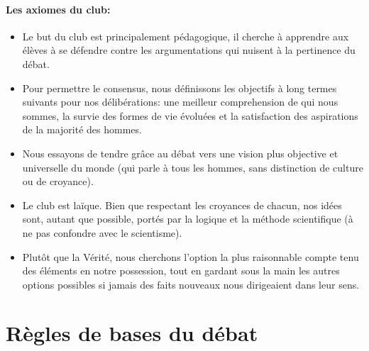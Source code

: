 \documentclass[a4paper,12pt]{article}
\begin{document}
\paragraph{Les axiomes du club:}
\begin{itemize}
 \item  Le but du club est principalement pédagogique, il cherche à apprendre aux élèves à se défendre contre les argumentations qui nuisent à la pertinence du débat.
 \item  Pour permettre le consensus, nous définissons les objectifs à long termes suivants pour nos délibérations: une meilleur comprehension de qui nous sommes, la survie des formes de vie évoluées et la satisfaction des aspirations de la majorité des hommes.
 \item  Nous essayons de tendre grâce au débat vers une vision plus objective et universelle du monde (qui parle à tous les hommes, sans distinction de culture ou de croyance).
 \item  Le club est laïque. Bien que respectant les croyances de chacun, nos idées sont, autant que possible, portés par la logique et la méthode scientifique (à ne pas confondre avec le scientisme).
 \item  Plutôt que la Vérité, nous cherchons l'option la plus raisonnable compte tenu des éléments en notre possession, tout en gardant sous la main les autres options possibles si jamais des faits nouveaux nous dirigeaient dans leur sens.
\end{itemize}

\section{Règles de bases du débat}
\end{document}
